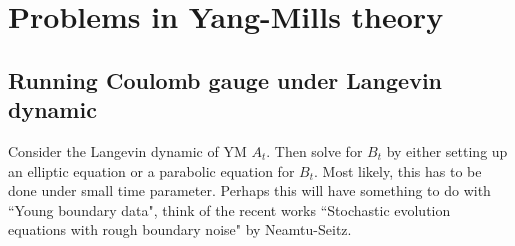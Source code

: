 \documentclass[./Research_statement.tex]{subfiles}
\begin{document}
\section{Problems in Yang-Mills theory}
\subsection{Running Coulomb gauge under Langevin dynamic}
Consider the Langevin dynamic of YM $A_t$. Then solve for $B_t$ by either setting up an elliptic equation or a parabolic equation for $B_t$. Most likely, this has to be done under small time parameter. Perhaps this will have something to do with ``Young boundary data", think of the recent works ``Stochastic evolution equations with rough boundary noise" by Neamtu-Seitz. 
\end{document}
